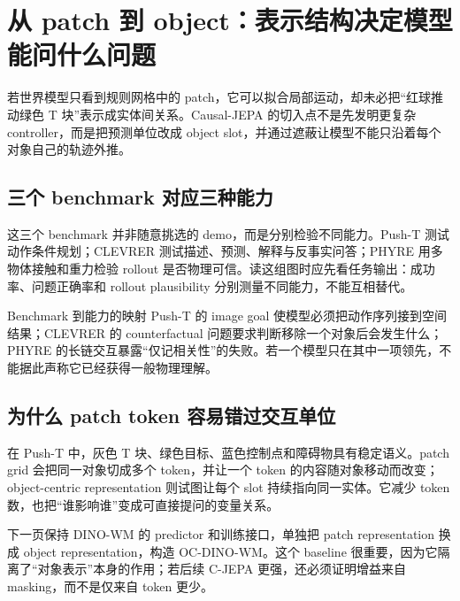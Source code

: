 \section{从 patch 到 object：表示结构决定模型能问什么问题}

若世界模型只看到规则网格中的 patch，它可以拟合局部运动，却未必把``红球推动绿色 T 块''表示成实体间关系。Causal-JEPA 的切入点不是先发明更复杂 controller，而是把预测单位改成 object slot，并通过遮蔽让模型不能只沿着每个对象自己的轨迹外推。

\subsection{三个 benchmark 对应三种能力}

这三个 benchmark 并非随意挑选的 demo，而是分别检验不同能力。Push-T 测试动作条件规划；CLEVRER 测试描述、预测、解释与反事实问答；PHYRE 用多物体接触和重力检验 rollout 是否物理可信。读这组图时应先看任务输出：成功率、问题正确率和 rollout plausibility 分别测量不同能力，不能互相替代。


\begin{knowledgebox}{Benchmark 到能力的映射}
Push-T 的 image goal 使模型必须把动作序列接到空间结果；CLEVRER 的 counterfactual 问题要求判断移除一个对象后会发生什么；PHYRE 的长链交互暴露``仅记相关性''的失败。若一个模型只在其中一项领先，不能据此声称它已经获得一般物理理解。
\end{knowledgebox}

\subsection{为什么 patch token 容易错过交互单位}

在 Push-T 中，灰色 T 块、绿色目标、蓝色控制点和障碍物具有稳定语义。patch grid 会把同一对象切成多个 token，并让一个 token 的内容随对象移动而改变；object-centric representation 则试图让每个 slot 持续指向同一实体。它减少 token 数，也把``谁影响谁''变成可直接提问的变量关系。


下一页保持 DINO-WM 的 predictor 和训练接口，单独把 patch representation 换成 object representation，构造 OC-DINO-WM。这个 baseline 很重要，因为它隔离了``对象表示''本身的作用；若后续 C-JEPA 更强，还必须证明增益来自 masking，而不是仅来自 token 更少。

